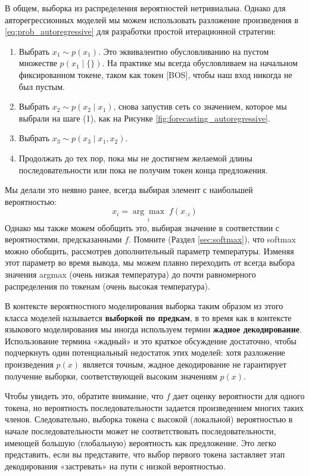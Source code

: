 В общем, выборка из распределения вероятностей нетривиальна. Однако для авторегрессионных моделей мы можем использовать разложение произведения в \eqref{eq:prob_autoregressive} для разработки простой итерационной стратегии:
%
\begin{enumerate}
\item Выбрать $x_1 \sim p(x_1)$. Это эквивалентно обусловливанию на пустом множестве $p(x_1 \mid \{\})$. На практике мы всегда обусловливаем на начальном фиксированном токене, таком как токен [BOS], чтобы наш вход никогда не был пустым.
\item Выбрать $x_2 \sim p(x_2 \mid x_1)$, снова запустив сеть со значением, которое мы выбрали на шаге (1), как на Рисунке \ref{fig:forecasting_autoregressive}.
\item Выбрать $x_3 \sim p(x_3 \mid x_1, x_2)$.
\item Продолжать до тех пор, пока мы не достигнем желаемой длины последовательности или пока не получим токен конца предложения.
\end{enumerate}

Мы делали это неявно ранее, всегда выбирая элемент с наибольшей вероятностью:
%
$$
x_i=\underset{i}{\arg\max} \;f(x_{:i})
$$
%
Однако мы также можем обобщить это, выбирая значение в соответствии с вероятностями, предсказанными $f$. Помните (Раздел \ref{sec:softmax}), что softmax можно обобщить, рассмотрев дополнительный параметр температуры. Изменяя этот параметр во время вывода, мы можем плавно переходить от всегда выбора значения argmax (очень низкая температура) до почти равномерного распределения по токенам (очень высокая температура).

В контексте вероятностного моделирования выборка таким образом из этого класса моделей называется \textbf{выборкой по предкам}, в то время как в контексте языкового моделирования мы иногда используем термин \textbf{жадное декодирование}. Использование термина «жадный» и это краткое обсуждение достаточно, чтобы подчеркнуть один потенциальный недостаток этих моделей: хотя разложение произведения $p(x)$ является точным, жадное декодирование не гарантирует получение выборки, соответствующей высоким значениям $p(x)$. 

Чтобы увидеть это, обратите внимание, что $f$ дает оценку вероятности для одного токена, но вероятность последовательности задается произведением многих таких членов. Следовательно, выборка токена с высокой (локальной) вероятностью в начале последовательности может не соответствовать последовательности, имеющей большую (глобальную) вероятность как предложение. Это легко представить, если вы представите, что выбор первого токена заставляет этап декодирования «застревать» на пути с низкой вероятностью.

